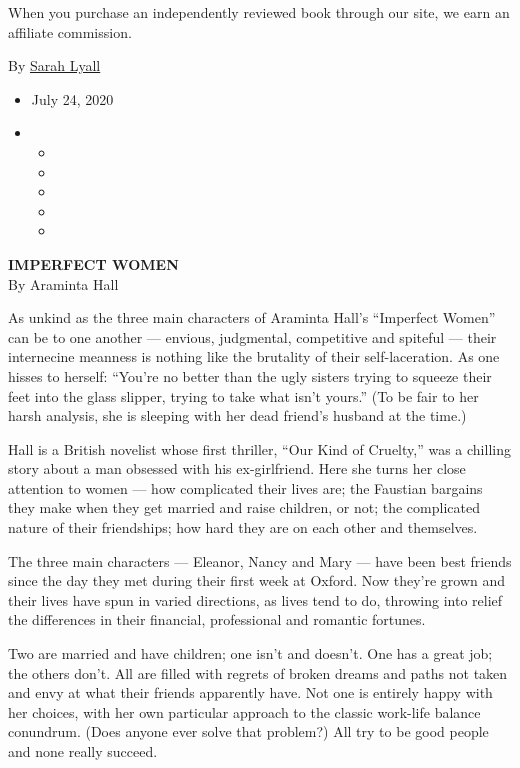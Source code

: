 When you purchase an independently reviewed book through our site, we
earn an affiliate commission.

By \href{https://www.nytimes.com/by/sarah-lyall}{Sarah Lyall}

\begin{itemize}
\item
  July 24, 2020
\item
  \begin{itemize}
  \item
  \item
  \item
  \item
  \item
  \end{itemize}
\end{itemize}

\textbf{IMPERFECT WOMEN}\\
By Araminta Hall

As unkind as the three main characters of Araminta Hall's ``Imperfect
Women'' can be to one another --- envious, judgmental, competitive and
spiteful --- their internecine meanness is nothing like the brutality of
their self-laceration. As one hisses to herself: ``You're no better than
the ugly sisters trying to squeeze their feet into the glass slipper,
trying to take what isn't yours.'' (To be fair to her harsh analysis,
she is sleeping with her dead friend's husband at the time.)

Hall is a British novelist whose first thriller, ``Our Kind of
Cruelty,'' was a chilling story about a man obsessed with his
ex-girlfriend. Here she turns her close attention to women --- how
complicated their lives are; the Faustian bargains they make when they
get married and raise children, or not; the complicated nature of their
friendships; how hard they are on each other and themselves.

The three main characters --- Eleanor, Nancy and Mary --- have been best
friends since the day they met during their first week at Oxford. Now
they're grown and their lives have spun in varied directions, as lives
tend to do, throwing into relief the differences in their financial,
professional and romantic fortunes.

Two are married and have children; one isn't and doesn't. One has a
great job; the others don't. All are filled with regrets of broken
dreams and paths not taken and envy at what their friends apparently
have. Not one is entirely happy with her choices, with her own
particular approach to the classic work-life balance conundrum. (Does
anyone ever solve that problem?) All try to be good people and none
really succeed.

